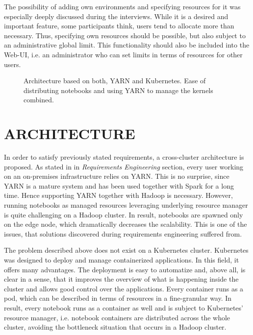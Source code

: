 \documentclass[a4paper,twoside]{article}
\begin{document}
The possibility of adding own environments and specifying resources for it was especially deeply discussed during the interviews. While it is a desired and important feature, some participants think, users tend to allocate more than necessary. Thus, specifying own resources should be possible, but also subject to an administrative global limit. This functionality should also be included into the Web-UI, i.e. an administrator who can set limits in terms of resources for other users.

\begin{figure*}[!h]
  \centering
   {}
  \caption{Architecture based on both, YARN and Kubernetes. Ease of distributing notebooks and using YARN to manage the kernels combined.}
  \label{fig:kubernetes_yarn}
\end{figure*}

\section{\uppercase{Architecture}}

In order to satisfy previously stated requirements, a cross-cluster architecture is proposed.  As stated in in \textit{Requirements Engineering} section, every user working on an on-premises infrastructure relies on YARN. This is no surprise, since YARN is a mature system and has been used together with Spark for a long time. Hence supporting YARN together with Hadoop is necessary. However, running notebooks as managed resources leveraging underlying resource manager is quite challenging on a Hadoop cluster. In result, notebooks are spawned only on the edge node, which dramatically decreases the scalability. This is one of the issues, that solutions discovered during requirements engineering suffered from. 

The problem described above does not exist on a Kubernetes cluster. Kubernetes was designed to deploy and manage containerized applications. In this field, it offers many advantages. The deployment is easy to automatize and, above all, is clear in a sense, that it improves the overview of what is happening inside the cluster and allows
good control over the applications. Every container runs as a pod, which can be described in terms of resources in a fine-granular way. In result, every notebook runs as a container as well and is subject to Kubernetes' resource manager, i.e. notebook containers are distributed across the whole cluster, avoiding the bottleneck situation that occurs in a Hadoop cluster. 
\end{document}
